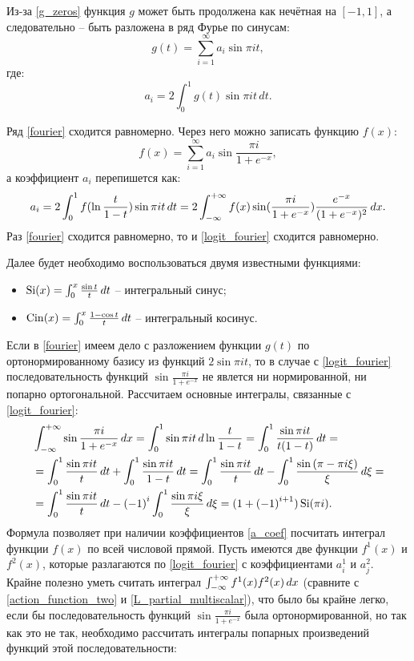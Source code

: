 Из-за \ref{g_zeros} функция $g$ может быть продолжена как нечётная на $[-1, 1]$, а следовательно -- быть разложена в ряд Фурье по синусам:
\begin{equation}
	g(t) = \sum_{i=1}^\infty a_i\sin{\pi it},
	\label{fourier}
\end{equation}
где:
\begin{equation}
	a_i = 2\int_0^1g(t) \sin{\pi it} \, dt.
	\label{a_coef}
\end{equation}

Ряд \ref{fourier} сходится равномерно. Через него можно записать функцию $f(x)$:
\begin{equation}
	f(x) = \sum_{i=1}^\infty a_i\sin{\frac{\pi i}{1 + e^{-x}}},
	\label{logit_fourier}
\end{equation}
а коэффициент $a_i$ перепишется как:
\begin{equation}
	a_i = 2\int_0^1f(\ln\frac{t}{1-t}) \sin{\pi it} \, dt = 2\int_{-\infty}^{+\infty} f(x)\sin(\frac{\pi i}{1+e^{-x}})\frac{e^{-x}}{(1+e^{-x})^2}\, dx.
	\label{a_coef_logit}
\end{equation}
Раз \ref{fourier} сходится равномерно, то и \ref{logit_fourier} сходится равномерно.

Далее будет необходимо воспользоваться двумя известными функциями:
\begin{itemize}
\item $\operatorname{Si}(x) = \int_0^x\frac{\sin t}{t}\, dt$ -- интегральный синус;
\item $\operatorname{Cin}(x) = \int_0^x\frac{1 - \cos t}{t}\, dt$ -- интегральный косинус.
\end{itemize}

Если в \ref{fourier} имеем дело с разложением функции $g(t)$ по ортонормированному базису из функций $2\sin{\pi it}$, то в случае с \ref{logit_fourier}
последовательность функций $\sin{\frac{\pi i}{1 + e^{-x}}}$ не явлется ни нормированной, ни попарно ортогональной. Рассчитаем основные интегралы, связанные с \ref{logit_fourier}:
\begin{align}
	&\int_{-\infty}^{+\infty}\sin{\frac{\pi i}{1+e^{-x}}} \, dx = \int_0^1\sin{\pi it} \, d\ln{\frac{t}{1-t}} = \int_0^1 \frac{\sin{\pi it}}{t(1-t)} \, dt = \notag \\
	&= \int_0^1 \frac{\sin{\pi it}}{t} \, dt + \int_0^1 \frac{\sin{\pi it}}{1-t} \, dt = \int_0^1 \frac{\sin{\pi it}}{t} \, dt - \int_0^1 \frac{\sin{(\pi - \pi i\xi)}}{\xi} \, d\xi = \notag \\
	&= \int_0^1 \frac{\sin{\pi it}}{t} \, dt - {(-1)}^i\int_0^1 \frac{\sin{\pi i\xi}}{\xi} \, d\xi = (1 + {(-1)}^{i+1})\operatorname{Si}(\pi i).
	\label{f_int}
\end{align}
Формула \label{f_int} позволяет при наличии коэффициентов \ref{a_coef} посчитать интеграл функции $f(x)$ по всей числовой прямой. Пусть имеются две функции $f^1(x)$ и $f^2(x)$, которые разлагаются по \ref{logit_fourier} с коэффициентами $a^1_i$ и $a^2_j$. Крайне полезно уметь считать интеграл $\int_{-\infty}^{+\infty} f^1(x)f^2(x)\, dx$ (сравните с \ref{action_function_two} и \ref{L_partial_multiscalar}), что было бы крайне легко, если бы последовательность функций $\sin{\frac{\pi i}{1 + e^{-x}}}$ была ортонормированной, но так как это не так, необходимо рассчитать интегралы попарных произведений функций этой последовательности:

